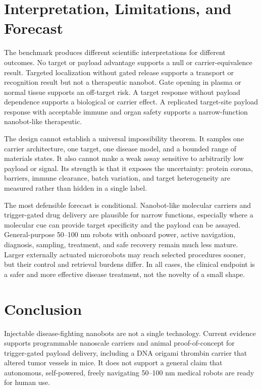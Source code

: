 \documentclass[conference]{IEEEtran}
\begin{document}
\section{Interpretation, Limitations, and Forecast}
\label{sec:forecast}
The benchmark produces different scientific interpretations for different outcomes. No target or payload advantage supports a null or carrier-equivalence result. Targeted localization without gated release supports a transport or recognition result but not a therapeutic nanobot. Gate opening in plasma or normal tissue supports an off-target risk. A target response without payload dependence supports a biological or carrier effect. A replicated target-site payload response with acceptable immune and organ safety supports a narrow-function nanobot-like therapeutic.

The design cannot establish a universal impossibility theorem. It samples one carrier architecture, one target, one disease model, and a bounded range of materials states. It also cannot make a weak assay sensitive to arbitrarily low payload or signal. Its strength is that it exposes the uncertainty: protein corona, barriers, immune clearance, batch variation, and target heterogeneity are measured rather than hidden in a single label.

The most defensible forecast is conditional. Nanobot-like molecular carriers and trigger-gated drug delivery are plausible for narrow functions, especially where a molecular cue can provide target specificity and the payload can be assayed. General-purpose 50--100 nm robots with onboard power, active navigation, diagnosis, sampling, treatment, and safe recovery remain much less mature. Larger externally actuated microrobots may reach selected procedures sooner, but their control and retrieval burdens differ. In all cases, the clinical endpoint is a safer and more effective disease treatment, not the novelty of a small shape.

\section{Conclusion}
\label{sec:conclusion}
Injectable disease-fighting nanobots are not a single technology. Current evidence supports programmable nanoscale carriers and animal proof-of-concept for trigger-gated payload delivery, including a DNA origami thrombin carrier that altered tumor vessels in mice. It does not support a general claim that autonomous, self-powered, freely navigating 50--100 nm medical robots are ready for human use.
\end{document}
